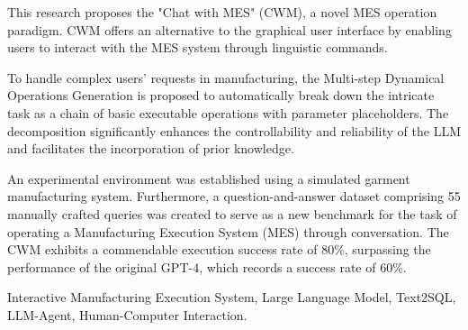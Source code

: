 \documentclass[preprint,12pt]{elsarticle}
\begin{document}
\begin{frontmatter}
\begin{highlights}
\item This research proposes the "Chat with MES" (CWM), a novel MES operation paradigm.
CWM offers an alternative to the graphical user interface by enabling users to interact with the MES system through linguistic commands.
\item To handle complex users' requests in manufacturing, the Multi-step Dynamical Operations Generation is proposed to automatically break down the intricate task as a chain of basic executable operations with parameter placeholders.
The decomposition significantly enhances the controllability and reliability of the LLM and facilitates the incorporation of prior knowledge.
\item An experimental environment was established using a simulated garment manufacturing system. Furthermore, a question-and-answer dataset comprising 55 manually crafted queries was created to serve as a new benchmark for the task of operating a Manufacturing Execution System (MES) through conversation. 
The CWM exhibits a commendable execution success rate of 80\%, surpassing the performance of the original GPT-4, which records a success rate of 60\%.

\end{highlights}

\begin{keyword}
Interactive Manufacturing Execution System, Large Language Model, Text2SQL, LLM-Agent, Human-Computer Interaction.



\end{keyword}

\end{frontmatter}
\end{document}
